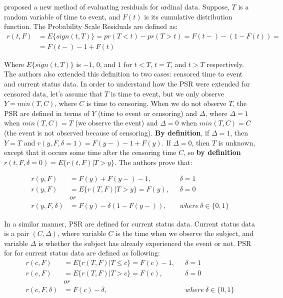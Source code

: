 \documentclass[]{article}
\begin{document}
\cite{li2012new} proposed a new method of evaluating residuals for ordinal data. Suppose, $T$ is a random variable of time to event, and $F(t)$ is its cumulative distribution function. The Probability Scale Residuals are defined as:\\
$$
\begin{aligned}
	r(t,F) &= E\{sign(t,T)\} = pr(T < t) - pr(T > t) = F(t-) - (1-F(t)) =\\
	 &=F(t-) - 1 + F(t)
	\end{aligned}
$$

Where $E\{sign(t,T)\}$ is $-1$, $0$, and $1$ for $t<T$, $t=T$, and $t>T$ respectively.
The authors also extended this definition to two cases: censored time to event and current status data. In order to understand how the PSR were extended for censored data, let's assume that $T$ is time to event, but we only observe $Y = min(T, C)$, where $C$ is time to censoring. When we do not observe $T$, the PSR are defined in terms of $Y$ (time to event or censoring) and $\Delta$, where $\Delta = 1$ when $min(T, C)=T$ (we observe the event) and $\Delta =0$ when $min(T, C)=C$ (the event is not observed because of censoring). \textbf{By definition}, if $\Delta = 1$, then $Y=T$ and $r(y,F, \delta=1) = F(y-) - 1 + F(y)$. If $\Delta = 0$, then $T$ is unknown, except that it occurs some time after the censoring time $C$, so \textbf{by definition} $r(t,F, \delta=0) = E\{r(t,F)|T>y\}$. The authors prove that:

	$$
	\begin{aligned}
		r(y, F) &= F(y) + F(y-) - 1,~~~&\delta = 1 \\
		r(y, F) &= E\{r(T,F)|T>y\} = F(y) ,~~~&\delta = 0 \\
		&or\\
    r(y, F, \delta) &= F(y) - \delta(1 - F(y-)),~~~&where~\delta \in \{0,1\}
	\end{aligned}
	$$

In a similar manner, PSR are defined for current status data. Current status data is a pair $(C, \Delta)$, where variable $C$ is the time when we observe the subject, and variable $\Delta$ is whether the subject has already experienced the event or not. PSR for for current status data are defined as following:
	$$
	\begin{aligned}
		r(c, F) &= E\{r(T,F)|T\leq c\} = F(c) - 1,~~~&\delta = 1 \\
		r(c, F) &= E\{r(T,F)|T>c\} = F(c) ,~~~&\delta = 0 \\
		&or\\
    r(c, F, \delta) &= F(c) - \delta,~~~&where~\delta \in \{0,1\}\\
	\end{aligned}
	$$
\end{document}

